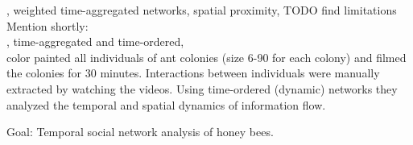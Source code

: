 \textcite{jeanson2012long}, weighted time-aggregated networks, spatial proximity, TODO find limitations\\

Mention shortly:\\

\textcite{blonder2011time}, time-aggregated and time-ordered,\\
\textcite{blonder2011time} color painted all individuals of ant colonies (size 6-90 for each colony) and filmed the colonies for 30 minutes. Interactions between individuals were manually extracted by watching the videos. Using time-ordered (dynamic) networks they analyzed the temporal and spatial dynamics of information flow.


Goal: Temporal social network analysis of honey bees.